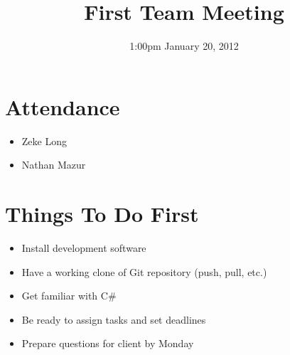 \documentclass{article}
\begin{document}
\title{First Team Meeting}
\date{1:00pm January 20, 2012}
\maketitle

\section{Attendance}
\begin{itemize}
\item Zeke Long
\item Nathan Mazur
\end{itemize}

\section{Things To Do First}
\begin{itemize}
\item Install development software
\item Have a working clone of Git repository (push, pull, etc.)
\item Get familiar with C\#
\item Be ready to assign tasks and set deadlines
\item Prepare questions for client by Monday
\end{itemize}
\end{document}
